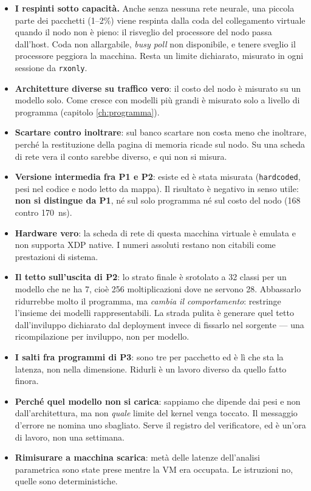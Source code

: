 \documentclass[11pt,a4paper,oneside]{report}
\begin{document}
\begin{itemize}
\item \textbf{I respinti sotto capacità.} Anche senza nessuna rete neurale, una
      piccola parte dei pacchetti (1--2\%) viene respinta dalla coda del
      collegamento virtuale quando il nodo non è pieno: il risveglio del
      processore del nodo passa dall'host. Coda non allargabile, \emph{busy poll}
      non disponibile, e tenere sveglio il processore peggiora la macchina. Resta
      un limite dichiarato, misurato in ogni sessione da \texttt{rxonly}.
\item \textbf{Architetture diverse su traffico vero}: il costo del nodo è misurato
      su un modello solo. Come cresce con modelli più grandi è misurato solo a
      livello di programma (capitolo \ref{ch:programma}).
\item \textbf{Scartare contro inoltrare}: sul banco scartare non costa meno che
      inoltrare, perché la restituzione della pagina di memoria ricade sul nodo.
      Su una scheda di rete vera il conto sarebbe diverso, e qui non si misura.
\item \textbf{Versione intermedia fra P1 e P2}: esiste ed è stata misurata
      (\texttt{hardcoded}, pesi nel codice e nodo letto da mappa). Il risultato
      è negativo in senso utile: \textbf{non si distingue da P1}, né sul solo
      programma né sul costo del nodo (168 contro 170~ns).
\item \textbf{Hardware vero}: la scheda di rete di questa macchina virtuale è
      emulata e non supporta XDP native. I numeri assoluti restano non citabili
      come prestazioni di sistema.
\item \textbf{Il tetto sull'uscita di P2}: lo strato finale è srotolato a 32
      classi per un modello che ne ha 7, cioè 256 moltiplicazioni dove ne
      servono 28. Abbassarlo ridurrebbe molto il programma, ma \emph{cambia il
      comportamento}: restringe l'insieme dei modelli rappresentabili. La strada
      pulita è generare quel tetto dall'inviluppo dichiarato dal deployment
      invece di fissarlo nel sorgente --- una ricompilazione per inviluppo, non
      per modello.
\item \textbf{I salti fra programmi di P3}: sono tre per pacchetto ed è lì che
      sta la latenza, non nella dimensione. Ridurli è un lavoro diverso da
      quello fatto finora.
\item \textbf{Perché quel modello non si carica}: sappiamo che dipende dai pesi
      e non dall'architettura, ma non \emph{quale} limite del kernel venga
      toccato. Il messaggio d'errore ne nomina uno sbagliato. Serve il registro
      del verificatore, ed è un'ora di lavoro, non una settimana.
\item \textbf{Rimisurare a macchina scarica}: metà delle latenze dell'analisi
      parametrica sono state prese mentre la VM era occupata. Le istruzioni no,
      quelle sono deterministiche.
\end{itemize}
\end{document}
